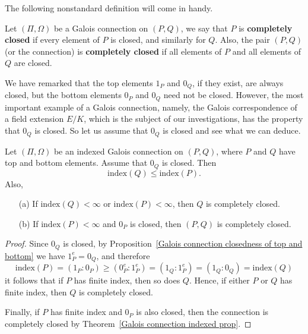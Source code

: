 The following nonstandard definition will come in handy.
\begin{definition}
Let $(\Pi,\Omega)$ be a Galois connection on $(P,Q)$, we say that $P$ is \textbf{completely closed} if every element of $P$ is closed, and similarly for $Q$. Also, the pair $(P,Q)$ (or the connection) is \textbf{completely closed} if all elements of $P$ and all elements of $Q$ are closed.
\end{definition}
We have remarked that the top elements $1_P$ and $0_Q$, if they exist, are always closed, but the bottom elements $0_P$ and $0_Q$ need not be closed. However, the most important example of a Galois connection, namely, the
Galois correspondence of a field extension $E/K$, which is the subject of our investigations, has the property that $0_Q$ is closed. So let us assume that $0_Q$ is closed and see what we can deduce.\par
\begin{theorem}\label{Galois connection 0_Q is closed}
Let $(\Pi,\Omega)$ be an indexed Galois connection on $(P,Q)$, where $P$ and $Q$ have top and bottom elements. Assume that $0_Q$ is closed. Then 
\[\mathrm{index}(Q)\leq\mathrm{index}(P).\]
Also,
\begin{itemize}
\item[(a)] If $\mathrm{index}(Q)<\infty$ or $\mathrm{index}(P)<\infty$, then $Q$ is completely closed.
\item[(b)] If $\mathrm{index}(P)<\infty$ and $0_P$ is closed, then $(P,Q)$ is completely closed.
\end{itemize}
\end{theorem}
\begin{proof}
Since $0_Q$ is closed, by Proposition~\ref{Galois connection closedness of top and bottom} we have $1_P^e=0_Q$, and therefore
\[\mathrm{index}(P)=(1_P:0_P)\geq(0_P^e:1_P^e)=(1_Q:1_P^e)=(1_Q:0_Q)=\mathrm{index}(Q)\]
it follows that if $P$ has finite index, then so does $Q$. Hence, if either $P$ or $Q$ has finite index, then $Q$ is completely closed.\par
Finally, if $P$ has finite index and $0_P$ is also closed, then the connection is completely closed by Theorem~\ref{Galois connection indexed prop}.
\end{proof}
